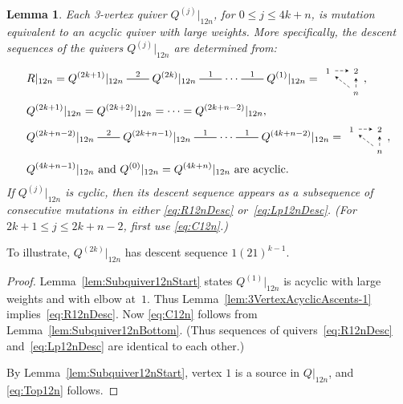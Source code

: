 \documentclass[11pt, letterpaper]{amsart}
\newtheorem{lemma}[theorem]{Lemma}
\theoremstyle{definition}
\numberwithin{equation}{section}
\newcommand{\mutation}[1]{\stackrel{#1}{\rule[.5ex]{2em}{0.5pt}}}
\begin{document}
\begin{lemma}
\label{lem:R12nSubquiv}
Each 3-vertex quiver $Q^{(j)}|_{12n}$, for $0\le j\le 4k+n$, is mutation equivalent to an acyclic quiver with large weights. 
More specifically, the descent sequences of the quivers $Q^{(j)}|_{12n}$ are determined from: 
\begin{align}
\label{eq:R12nDesc}
& R|_{12n} = Q^{(2k+1)}|_{12n} \mutation{2} Q^{(2k)}|_{12n} \mutation{1} \cdots \mutation{1} Q^{(1)}|_{12n} = 
{\begin{tikzcd}[arrows={-stealth}, sep=small, ampersand replacement=\&]
  \scriptstyle 1 \arrow[r, dashed] 
  \& \scriptstyle 2 
  \\
   \& \scriptstyle n \arrow[u, dashed] \arrow[lu, dashed]
\end{tikzcd}},
\\
\label{eq:C12n}
& Q^{(2k+1)}|_{12n}  = Q^{(2k+2)}|_{12n} = \cdots = Q^{(2k+n-2)}|_{12n} , 
\\
\label{eq:Lp12nDesc}
& Q^{(2k+n-2)}|_{12n} \mutation{2} Q^{(2k+n-1)}|_{12n} \mutation{1} \cdots \mutation{1} Q^{(4k+n-2)}|_{12n} = 
\begin{tikzcd}[arrows={-stealth}, sep=small, ampersand replacement=\&]
  \scriptstyle 1 \arrow[r, dashed] 
  \& \scriptstyle 2 
  \\
   \& \scriptstyle n \arrow[u, dashed] \arrow[lu, dashed]
\end{tikzcd}, \\
\label{eq:Top12n}
& \text{$Q^{(4k+n-1)}|_{12n}$ and~$Q^{(0)}|_{12n}=Q^{(4k+n)}|_{12n}$ are acyclic.}
\end{align}
If $Q^{(j)}|_{12n}$ is cyclic, then its descent sequence appears as a subsequence of consecutive mutations 
in either \eqref{eq:R12nDesc} or~\eqref{eq:Lp12nDesc}. 
(For $2k+1\le j\le 2k+n-2$, first use \eqref{eq:C12n}.) 
\end{lemma}

To illustrate, $Q^{(2k)}|_{12n}$ has descent sequence $1(21)^{k-1}$.

\pagebreak[3]

\begin{proof}

Lemma~\ref{lem:Subquiver12nStart} states $Q^{(1)}|_{12n}$ is acyclic with large weights and with elbow at~$1$. 
Thus Lemma~\ref{lem:3VertexAcyclicAscents-1} implies~\eqref{eq:R12nDesc}.
Now \eqref{eq:C12n} follows from Lemma~\ref{lem:Subquiver12nBottom}. 
(Thus sequences of quivers~\eqref{eq:R12nDesc} and~\eqref{eq:Lp12nDesc} are identical to each other.)

By Lemma~\ref{lem:Subquiver12nStart}, vertex $1$ is a source in $Q|_{12n}$, and \eqref{eq:Top12n} follows. 
\end{proof}
\end{document}
